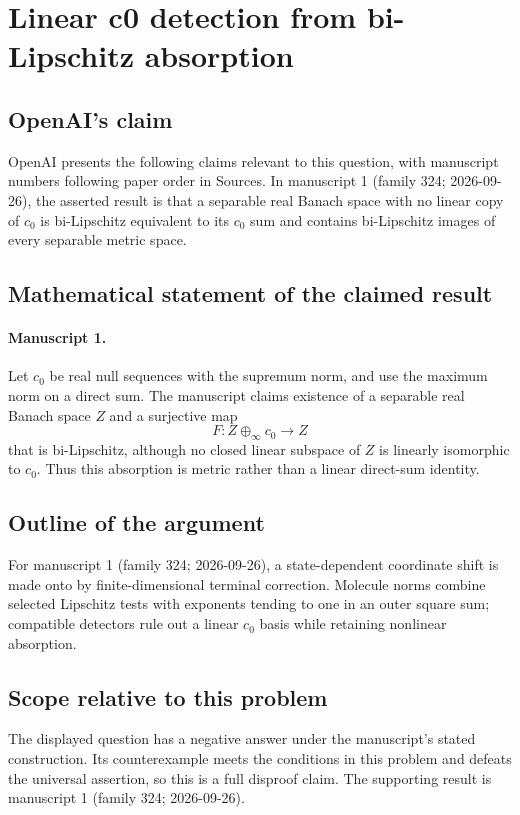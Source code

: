\documentclass[11pt]{article}
\begin{document}
\section*{Linear c0 detection from bi-Lipschitz absorption}

\subsection{OpenAI's claim}
OpenAI presents the following claims relevant to this question, with manuscript numbers following paper order in Sources. In manuscript 1 (family 324; 2026-09-26), the asserted result is that a separable real Banach space with no linear copy of $c_0$ is bi-Lipschitz equivalent to its $c_0$ sum and contains bi-Lipschitz images of every separable metric space.

\subsection{Mathematical statement of the claimed result}
\paragraph{Manuscript 1.}
Let $c_0$ be real null sequences with the supremum norm, and use the maximum norm on a direct sum. The manuscript claims existence of a separable real Banach space $Z$ and a surjective map
\[
 F:Z\oplus_{\infty} c_0\longrightarrow Z
\]
that is bi-Lipschitz, although no closed linear subspace of $Z$ is linearly isomorphic to $c_0$. Thus this absorption is metric rather than a linear direct-sum identity.

\subsection{Outline of the argument}
For manuscript 1 (family 324; 2026-09-26), a state-dependent coordinate shift is made onto by finite-dimensional terminal correction. Molecule norms combine selected Lipschitz tests with exponents tending to one in an outer square sum; compatible detectors rule out a linear $c_0$ basis while retaining nonlinear absorption.

\subsection{Scope relative to this problem}
The displayed question has a negative answer under the manuscript's stated construction. Its counterexample meets the conditions in this problem and defeats the universal assertion, so this is a full disproof claim. The supporting result is manuscript 1 (family 324; 2026-09-26).
\end{document}
